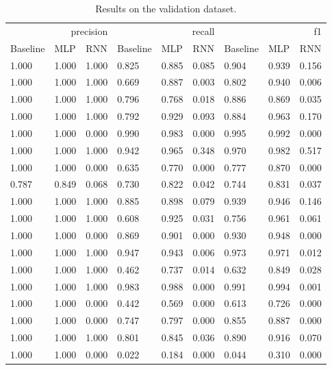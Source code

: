 \begin{table}
\caption{Results on the validation dataset.}
\label{tab::ex_2_valid}
\begin{tabular}{|l||l||l||l||l||l||l||l||l|}
\toprule
\multicolumn{3}{r}{precision} & \multicolumn{3}{r}{recall} & \multicolumn{3}{r}{f1} \\
Baseline & MLP & RNN & Baseline & MLP & RNN & Baseline & MLP & RNN \\
\midrule
1.000 & 1.000 & 1.000 & 0.825 & 0.885 & 0.085 & 0.904 & 0.939 & 0.156 \\
1.000 & 1.000 & 1.000 & 0.669 & 0.887 & 0.003 & 0.802 & 0.940 & 0.006 \\
1.000 & 1.000 & 1.000 & 0.796 & 0.768 & 0.018 & 0.886 & 0.869 & 0.035 \\
1.000 & 1.000 & 1.000 & 0.792 & 0.929 & 0.093 & 0.884 & 0.963 & 0.170 \\
1.000 & 1.000 & 0.000 & 0.990 & 0.983 & 0.000 & 0.995 & 0.992 & 0.000 \\
1.000 & 1.000 & 1.000 & 0.942 & 0.965 & 0.348 & 0.970 & 0.982 & 0.517 \\
1.000 & 1.000 & 0.000 & 0.635 & 0.770 & 0.000 & 0.777 & 0.870 & 0.000 \\
0.787 & 0.849 & 0.068 & 0.730 & 0.822 & 0.042 & 0.744 & 0.831 & 0.037 \\
1.000 & 1.000 & 1.000 & 0.885 & 0.898 & 0.079 & 0.939 & 0.946 & 0.146 \\
1.000 & 1.000 & 1.000 & 0.608 & 0.925 & 0.031 & 0.756 & 0.961 & 0.061 \\
1.000 & 1.000 & 0.000 & 0.869 & 0.901 & 0.000 & 0.930 & 0.948 & 0.000 \\
1.000 & 1.000 & 1.000 & 0.947 & 0.943 & 0.006 & 0.973 & 0.971 & 0.012 \\
1.000 & 1.000 & 1.000 & 0.462 & 0.737 & 0.014 & 0.632 & 0.849 & 0.028 \\
1.000 & 1.000 & 1.000 & 0.983 & 0.988 & 0.000 & 0.991 & 0.994 & 0.001 \\
1.000 & 1.000 & 0.000 & 0.442 & 0.569 & 0.000 & 0.613 & 0.726 & 0.000 \\
1.000 & 1.000 & 0.000 & 0.747 & 0.797 & 0.000 & 0.855 & 0.887 & 0.000 \\
1.000 & 1.000 & 1.000 & 0.801 & 0.845 & 0.036 & 0.890 & 0.916 & 0.070 \\
1.000 & 1.000 & 0.000 & 0.022 & 0.184 & 0.000 & 0.044 & 0.310 & 0.000 \\
\bottomrule
\end{tabular}
\end{table}
